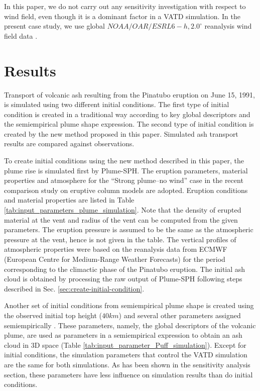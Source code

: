 \documentclass[utf8]{frontiersSCNS} %
\begin{document}
In this paper, we do not carry out any sensitivity investigation with respect to wind field, even though it is a dominant factor in a VATD simulation. In the present case study, we use global $NOAA/OAR/ESRL 6-h, 2.0^{\circ}$ reanalysis wind field data \citep{whitaker2004reanalysis, compo2006feasibility, compo2011twentieth}.

\section{Results}

Transport of volcanic ash resulting from the Pinatubo eruption on June 15, 1991, is simulated using two different initial conditions.
The first type of initial condition is created in a traditional way according to key global descriptors and the semiempirical plume shape expression. The second type of initial condition is created by the new method proposed in this paper. Simulated ash transport results are compared against observations.

To create initial conditions using the new method described in this paper, the plume rise is simulated first by Plume-SPH. The eruption parameters, material properties and atmosphere for the ``Strong plume--no wind'' case in the recent comparison study on eruptive column models \citep {costa2016results} are adopted. Eruption conditions and material properties are listed in Table \ref{tab:input_parameters_plume_simulation}. Note that the density of erupted material at the vent and radius of the vent can be computed from the given parameters. The eruption pressure is assumed to be the same as the atmospheric pressure at the vent, hence is not given in the table. The vertical profiles of atmospheric properties were  based on the reanalysis data from ECMWF (European Centre for Medium-Range Weather Forecasts) for the period corresponding to the climactic phase of the Pinatubo eruption. The initial ash cloud is obtained by processing the raw output of Plume-SPH following steps described in Sec. \ref{sec:create-initial-condition}.

Another set of initial conditions from  semiempirical plume shape is created using the observed initial top height ($40 km$) and several other parameters assigned semiempirically \citep{bursik2012estimation}. These parameters, namely, the global descriptors of the volcanic plume, are used as parameters in a semiempirical expression to obtain an ash cloud in 3D space (Table \ref{tab:input_parameter_Puff_simulation}). Except for initial conditions, the simulation parameters that control the VATD simulation are the same for both simulations. As has been shown in the sensitivity analysis section, these parameters have less influence on simulation results than do initial conditions.
\end{document}
